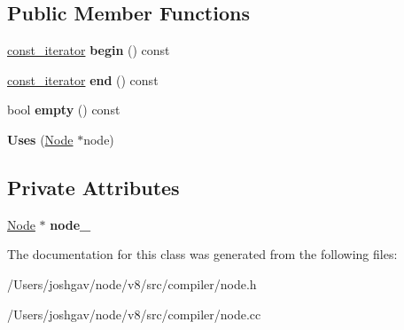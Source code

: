 \subsection*{Public Member Functions}
\begin{DoxyCompactItemize}
\item 
\hyperlink{classv8_1_1internal_1_1compiler_1_1_node_1_1_uses_1_1const__iterator}{const\+\_\+iterator} {\bfseries begin} () const \hypertarget{classv8_1_1internal_1_1compiler_1_1_node_1_1_uses_aab51914f1f31fb8654d8f948ac8e35e1}{}\label{classv8_1_1internal_1_1compiler_1_1_node_1_1_uses_aab51914f1f31fb8654d8f948ac8e35e1}

\item 
\hyperlink{classv8_1_1internal_1_1compiler_1_1_node_1_1_uses_1_1const__iterator}{const\+\_\+iterator} {\bfseries end} () const \hypertarget{classv8_1_1internal_1_1compiler_1_1_node_1_1_uses_a38bc4ef15754355b7265f7aff422e278}{}\label{classv8_1_1internal_1_1compiler_1_1_node_1_1_uses_a38bc4ef15754355b7265f7aff422e278}

\item 
bool {\bfseries empty} () const \hypertarget{classv8_1_1internal_1_1compiler_1_1_node_1_1_uses_a60275f27178ef0cfcb7e6eced73937cc}{}\label{classv8_1_1internal_1_1compiler_1_1_node_1_1_uses_a60275f27178ef0cfcb7e6eced73937cc}

\item 
{\bfseries Uses} (\hyperlink{classv8_1_1internal_1_1compiler_1_1_node}{Node} $\ast$node)\hypertarget{classv8_1_1internal_1_1compiler_1_1_node_1_1_uses_a2b32cd8b099c41442d481618b43c607e}{}\label{classv8_1_1internal_1_1compiler_1_1_node_1_1_uses_a2b32cd8b099c41442d481618b43c607e}

\end{DoxyCompactItemize}
\subsection*{Private Attributes}
\begin{DoxyCompactItemize}
\item 
\hyperlink{classv8_1_1internal_1_1compiler_1_1_node}{Node} $\ast$ {\bfseries node\+\_\+}\hypertarget{classv8_1_1internal_1_1compiler_1_1_node_1_1_uses_addcafb76d6b4558bdb510d90e35d0096}{}\label{classv8_1_1internal_1_1compiler_1_1_node_1_1_uses_addcafb76d6b4558bdb510d90e35d0096}

\end{DoxyCompactItemize}


The documentation for this class was generated from the following files\+:\begin{DoxyCompactItemize}
\item 
/\+Users/joshgav/node/v8/src/compiler/node.\+h\item 
/\+Users/joshgav/node/v8/src/compiler/node.\+cc\end{DoxyCompactItemize}
